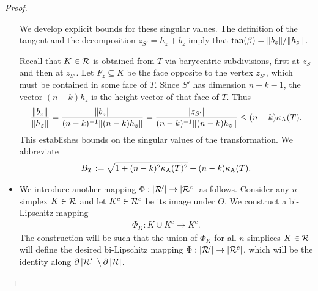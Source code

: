 \documentclass[10pt,a4paper]{article}
\begin{document}
\begin{proof}
\begin{itemize}
        We develop explicit bounds for these singular values. 
        The definition of the tangent and the decomposition $z_{S'} = h_{z} + b_{z}$ 
        imply that $\tan(\beta) = \|  b_{z}  \| / \|  h_{z}  \|$.
        
        Recall that $K \in {\mathcal R}$ is obtained from $T$ via barycentric subdivisions, first at $z_{S}$ and then at $z_{S'}$. 
        Let $F_{z} \subseteq K$ be the face opposite to the vertex $z_{S'}$,
        which must be contained in some face of $T$. 
        Since $S'$ has dimension $n-k-1$, the vector $(n-k) h_{z}$ is the height vector of that face of $T$. 
        Thus 
        \begin{align*}
            \frac{ \|  b_{z}  \| }{ \|  h_{z}  \| }
            = 
            \frac{ \|  b_{z}  \| }{ (n-k)^{-1} \| (n-k) h_{z} \| }
            = 
            \frac{ \|  z_{S'}  \| }{ (n-k)^{-1} \| (n-k) h_{z} \| }
            \leq 
            (n-k) \kappa_{\rm A}(T)
            .
        \end{align*}
        This establishes bounds on the singular values of the transformation. 
        We abbreviate 
        \begin{align}\label{math:upper_bound_for_theta}
            B_{T} 
            := 
            \sqrt{ 
                1 + (n-k)^{2} \aspectratio(T)^{2} %
            } 
            + 
            (n-k) \aspectratio(T) %
            .
        \end{align}
        
        
        \item 
        We introduce another mapping $\Phi : \left| {\mathcal R}' \right| \rightarrow \left| {\mathcal R}^{c} \right|$ as follows. 
        Consider any $n$-simplex $K \in {\mathcal R}$ and let $K^c \in {\mathcal R}^{c}$ be its image under $\Theta$.
        We construct a bi-Lipschitz mapping 
        \begin{align*}
            \Phi_{K} : K \cup K^{c} \rightarrow K^{c}.
        \end{align*}
        The construction will be such that the union of $\Phi_{K}$ for all $n$-simplices $K \in {\mathcal R}$
        will define the desired bi-Lipschitz mapping $\Phi : \left| {\mathcal R}' \right| \rightarrow \left| {\mathcal R}^{c} \right|$,
        which will be the identity along $\partial\left| {\mathcal R}' \right| \setminus \partial\left| {\mathcal R} \right|$.
        

\end{itemize}
\end{proof}
\end{document}
